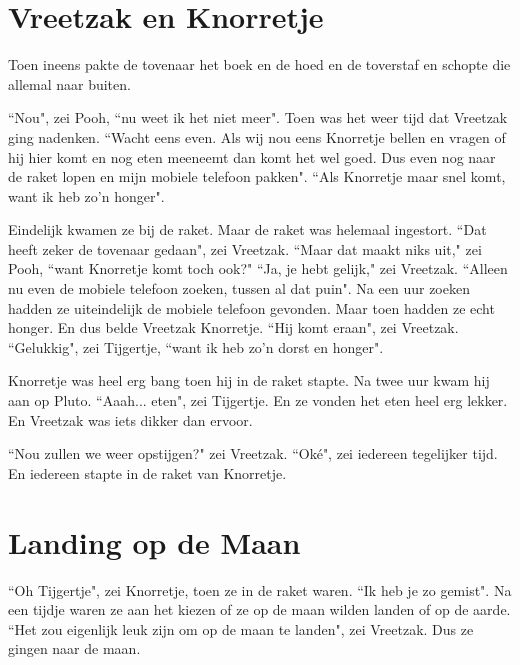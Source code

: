 \documentclass{article}
\begin{document}
\section{Vreetzak en Knorretje}

Toen ineens pakte de tovenaar het boek en de hoed en de toverstaf en schopte die allemal naar buiten.

``Nou", zei Pooh, ``nu weet ik het niet meer". Toen was het weer tijd dat Vreetzak ging nadenken. ``Wacht eens even. Als wij nou eens Knorretje bellen en vragen of hij hier komt en nog eten meeneemt dan komt het wel goed. Dus even nog naar de raket lopen en mijn mobiele telefoon pakken". ``Als Knorretje maar snel komt, want ik heb zo'n honger".

Eindelijk kwamen ze bij de raket. Maar de raket was helemaal ingestort. ``Dat heeft zeker de tovenaar gedaan", zei Vreetzak. ``Maar dat maakt niks uit," zei Pooh, ``want Knorretje komt toch ook?" ``Ja, je hebt gelijk," zei Vreetzak. ``Alleen nu even de mobiele telefoon zoeken, tussen al dat puin". Na een uur zoeken hadden ze uiteindelijk de mobiele telefoon gevonden. Maar toen hadden ze echt honger. En dus belde Vreetzak Knorretje. ``Hij komt eraan", zei Vreetzak. ``Gelukkig", zei Tijgertje, ``want ik heb zo'n dorst en honger".

Knorretje was heel erg bang toen hij in de raket stapte. Na twee uur kwam hij aan op Pluto. ``Aaah... eten", zei Tijgertje. En ze vonden het eten heel erg lekker. En Vreetzak was iets dikker dan ervoor.

``Nou zullen we weer opstijgen?" zei Vreetzak. ``Oké", zei iedereen tegelijker tijd. En iedereen stapte in de raket van Knorretje.

\section{Landing op de Maan}

``Oh Tijgertje", zei Knorretje, toen ze in de raket waren. ``Ik heb je zo gemist". Na een tijdje waren ze aan het kiezen of ze op de maan wilden landen of op de aarde. ``Het zou eigenlijk leuk zijn om op de maan te landen", zei Vreetzak. Dus ze gingen naar de maan.
\end{document}
